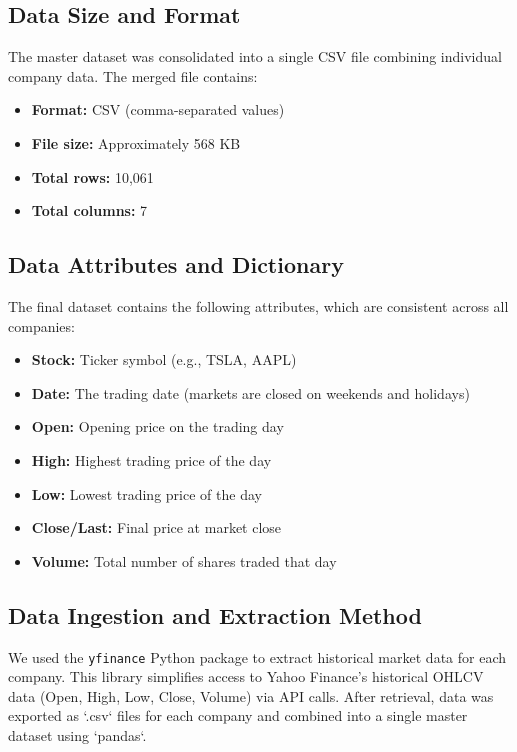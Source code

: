 \documentclass[runningheads]{llncs}
\begin{document}
\subsection{Data Size and Format}
The master dataset was consolidated into a single CSV file combining individual company data. The merged file contains:
\begin{itemize}
    \item \textbf{Format:} CSV (comma-separated values)
    \item \textbf{File size:} Approximately 568 KB
    \item \textbf{Total rows:} 10,061
    \item \textbf{Total columns:} 7
\end{itemize}

\subsection{Data Attributes and Dictionary}
The final dataset contains the following attributes, which are consistent across all companies:
\begin{itemize}
    \item \textbf{Stock:} Ticker symbol (e.g., TSLA, AAPL)
    \item \textbf{Date:} The trading date (markets are closed on weekends and holidays)
    \item \textbf{Open:} Opening price on the trading day
    \item \textbf{High:} Highest trading price of the day
    \item \textbf{Low:} Lowest trading price of the day
    \item \textbf{Close/Last:} Final price at market close
    \item \textbf{Volume:} Total number of shares traded that day
\end{itemize}

\subsection{Data Ingestion and Extraction Method}
We used the \texttt{yfinance} Python package to extract historical market data for each company. This library simplifies access to Yahoo Finance's historical OHLCV data (Open, High, Low, Close, Volume) via API calls. After retrieval, data was exported as `.csv` files for each company and combined into a single master dataset using `pandas`.
\end{document}
